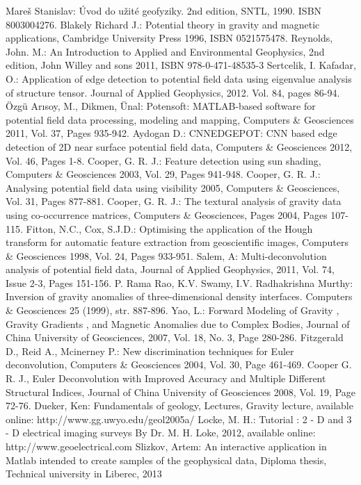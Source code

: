 \documentclass[FM]{tulthesis}
\begin{document}
\renewcommand{\refname}{References}
\begin{thebibliography}{References}
Mareš Stanislav: Úvod do užité geofyziky. 2nd edition, SNTL, 1990. ISBN 8003004276.
Blakely Richard J.: Potential theory in gravity and magnetic applications, Cambridge University Press 1996, ISBN 0521575478. 
Reynolds, John. M.: An Introduction to Applied and Environmental Geophysics, 2nd edition, John Willey and sons 2011, ISBN 978-0-471-48535-3
Sertcelik, I. Kafadar, O.: Application of edge detection to potential field data using eigenvalue analysis of structure tensor. Journal of Applied Geophysics, 2012. Vol. 84, pages 86-94.
Özgü Arısoy, M., Dikmen, Ünal: Potensoft: MATLAB-based software for potential field data processing, modeling and mapping, Computers \& Geosciences 2011, Vol. 37, Pages 935-942.
Aydogan D.: CNNEDGEPOT: CNN based edge detection of 2D near surface potential field data, Computers \& Geosciences 2012, Vol. 46, Pages 1-8.
Cooper, G. R. J.: Feature detection using sun shading, Computers \& Geosciences 2003, Vol. 29, Pages 941-948.
Cooper, G. R. J.: Analysing potential field data using visibility 2005, Computers \& Geosciences, Vol. 31, Pages 877-881.
Cooper, G. R. J.: The textural analysis of gravity data using co-occurrence matrices, Computers \& Geosciences, Pages 2004, Pages 107-115.
Fitton, N.C., Cox, S.J.D.: Optimising the application of the Hough transform for automatic feature extraction from geoscientific images, Computers \& Geosciences 1998, Vol. 24, Pages 933-951.
Salem, A: Multi-deconvolution analysis of potential field data, Journal of Applied Geophysics, 2011, Vol. 74, Issue 2-3, Pages 151-156.
P. Rama Rao, K.V. Swamy, I.V. Radhakrishna Murthy: Inversion of gravity anomalies of three-dimensional density interfaces. Computers \& Geosciences 25 (1999), str. 887-896.
Yao, L.: Forward Modeling of Gravity , Gravity Gradients , and Magnetic Anomalies due to Complex Bodies, Journal of China University of Geosciences, 2007, Vol. 18, No. 3, Page 280-286.
Fitzgerald D., Reid A., Mcinerney P.: New discrimination techniques for Euler deconvolution, Computers \& Geosciences 2004, Vol. 30, Page 461-469.
Cooper G. R. J., Euler Deconvolution with Improved Accuracy and Multiple Different Structural Indices, Journal of China University of Geosciences 2008, Vol. 19, Page 72-76.
Dueker, Ken: Fundamentals of geology, Lectures, Gravity lecture, available online: http://www.gg.uwyo.edu/geol2005a/
Locke, M. H.: Tutorial : 2 - D and 3 - D electrical imaging surveys By Dr. M. H. Loke, 2012, available online: http://www.geoelectrical.com
Slizkov, Artem: An interactive application in Matlab intended to create samples of the geophysical data, Diploma thesis, Technical university in Liberec, 2013
\end{thebibliography}
\end{document}
